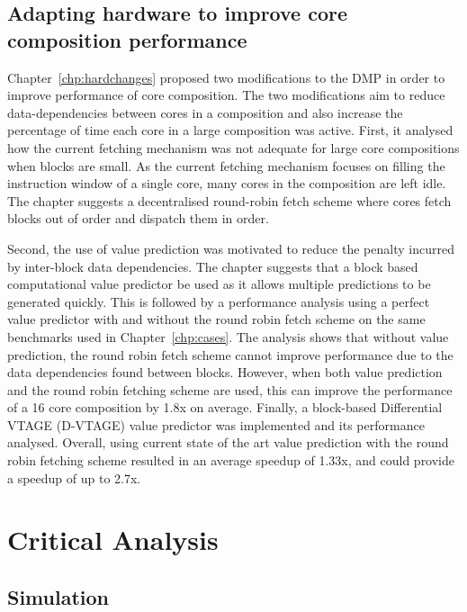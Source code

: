 \subsection{Adapting hardware to improve core composition performance}
Chapter~\ref{chp:hardchanges} proposed two modifications to the DMP in order to improve performance of core composition.
The two modifications aim to reduce data-dependencies between cores in a composition and also increase the percentage of time each core in a large composition was active.
First, it analysed how the current fetching mechanism was not adequate for large core compositions when blocks are small.
As the current fetching mechanism focuses on filling the instruction window of a single core, many cores in the composition are left idle.
The chapter suggests a decentralised round-robin fetch scheme where cores fetch blocks out of order and dispatch them in order.

Second, the use of value prediction was motivated to reduce the penalty incurred by inter-block data dependencies.
The chapter suggests that a block based computational value predictor be used as it allows multiple predictions to be generated quickly.
This is followed by a performance analysis using a perfect value predictor with and without the round robin fetch scheme on the same benchmarks used in Chapter~\ref{chp:cases}.
The analysis shows that without value prediction, the round robin fetch scheme cannot improve performance due to the data dependencies found between blocks.
However, when both value prediction and the round robin fetching scheme are used, this can improve the performance of a 16 core composition by 1.8x on average.
Finally, a block-based Differential VTAGE (D-VTAGE) value predictor was implemented and its performance analysed.
Overall, using current state of the art value prediction with the round robin fetching scheme resulted in an average speedup of 1.33x, and could provide a speedup of up to 2.7x.

\section{Critical Analysis}

\subsection{Simulation}

